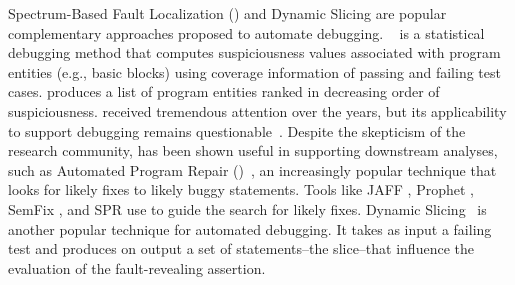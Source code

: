 \documentclass[sigplan,10pt,review,anonymous]{acmart}\settopmatter{printfolios=true,printccs=false,printacmref=false}
\begin{document}
Spectrum-Based Fault Localization (\sfl{}) and Dynamic Slicing are
popular complementary approaches proposed to automate debugging.
\sfl{}~\cite{7390282} is a statistical debugging method that computes
suspiciousness values associated with program entities (e.g., basic
blocks) using coverage information of passing and failing test
cases. \sfl{} produces a list of program entities ranked in
decreasing order of suspiciousness.  \sfl{} received tremendous
attention over the years, but its applicability to support debugging
remains
questionable~\cite{ang-perez-van-deursen-rui-2017,Pearson:2017:EIF:3097368.3097441,Xie:2016:RAD:2884781.2884834}.
Despite the skepticism of the research community, \sfl{} has been shown
useful in supporting downstream analyses, such as Automated Program Repair
(\apr{})~\cite{automatic-software-repair-survey2017,kim-etal-daghstul2017},
an increasingly popular technique that looks for likely fixes to
likely buggy statements.  Tools like JAFF \cite{arcuri-2011}, Prophet
\cite{long-rinard-2016}, SemFix \cite{nguyen-qi-roychoudhury-2013},
and SPR \cite{long-rinard-2015} use \sfl{} to guide the search for
likely fixes. Dynamic Slicing~\cite{Agrawal:1990:DPS:93542.93576} is another popular
technique for automated debugging. It takes as input a failing test
and produces on output a set of statements--the slice--that influence
the evaluation of the fault-revealing assertion.


\end{document}
